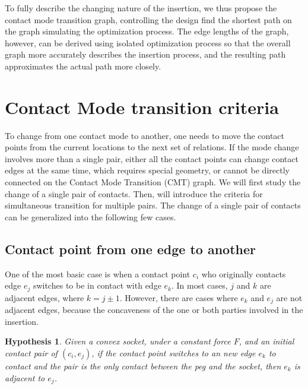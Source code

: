 \documentclass[11p]{article}
\newtheorem{hypothesis}{Hypothesis}
\begin{document}
To fully describe the changing nature of the insertion, we thus propose the contact mode transition graph, controlling the design find the shortest path on the graph simulating the optimization process. The edge lengths of the graph, however, can be derived using isolated optimization process so that the overall graph more accurately describes the insertion process, and the resulting path approximates the actual path more closely. 

\section{Contact Mode transition criteria}

To change from one contact mode to another, one needs to move the contact points from the current locations to the next set of relations. If the mode change involves more than a single pair, either all the contact points can change contact edges at the same time, which requires special geometry, or cannot be directly connected on the Contact Mode Transition (CMT) graph. We will first study the change of a single pair of contacts. Then, will introduce the criteria for simultaneous transition for multiple pairs. The change of a single pair of contacts can be generalized into the following few cases. 


\subsection{Contact point from one edge to another}

One of the most basic case is when a contact point $c_i$ who originally contacts edge $e_j$ switches to be in contact with edge $e_k$. In most cases, $j$ and $k$ are adjacent edges, where $k = j\pm 1$. However, there are cases where $e_k$ and $e_j$ are not adjacent edges, because the concaveness of the one or both parties involved in the insertion. 

\begin{hypothesis}
Given a convex socket, under a constant force $F$, and an initial contact pair of $(c_i, e_j)$, if the contact point switches to an new edge $e_k$ to contact and the pair is the only contact between the peg and the socket, then $e_k$ is adjacent to $e_j$. 
\end{hypothesis}
\end{document}
